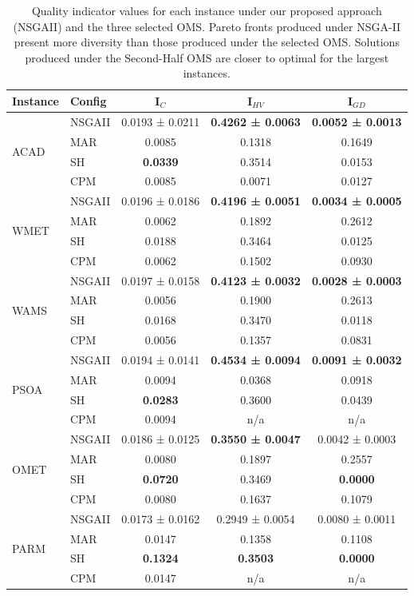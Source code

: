 \documentclass[conference]{IEEEtran}
\begin{document}
\begin{table}[htbp]
  \centering
  \caption{Quality indicator values for each instance under our proposed approach (NSGAII) and the three selected OMS. Pareto fronts produced under NSGA-II present more diversity than those produced under the selected OMS. Solutions produced under the Second-Half OMS are closer to optimal for the largest instances.}
    \begin{tabular}{p{0.7cm} p{0.7cm} ccc}
    \toprule
    \textbf{Instance} & \textbf{Config} & \textbf{I$_{C}$} & \textbf{I$_{HV}$} & \textbf{I$_{GD}$} \\
    \midrule
    \multirow{4}[2]{*}{ACAD} & NSGAII & 0.0193 ± 0.0211 & \textbf{0.4262 ± 0.0063} & \textbf{0.0052 ± 0.0013} \\
          & MAR   & 0.0085 & 0.1318 & 0.1649 \\
          & SH    & \textbf{0.0339} & 0.3514 & 0.0153 \\
          & CPM   & 0.0085 & 0.0071 & 0.0127 \\
    \multirow{4}[2]{*}{WMET} & NSGAII & 0.0196 ± 0.0186 & \textbf{0.4196 ± 0.0051} & \textbf{0.0034 ± 0.0005} \\
          & MAR   & 0.0062 & 0.1892 & 0.2612 \\
          & SH    & 0.0188 & 0.3464 & 0.0125 \\
          & CPM   & 0.0062 & 0.1502 & 0.0930 \\
    \multirow{4}[2]{*}{WAMS} & NSGAII & 0.0197 ± 0.0158 & \textbf{0.4123 ± 0.0032} & \textbf{0.0028 ± 0.0003} \\
          & MAR   & 0.0056 & 0.1900 & 0.2613 \\
          & SH    & 0.0168 & 0.3470 & 0.0118 \\
          & CPM   & 0.0056 & 0.1357 & 0.0831 \\
    \multirow{4}[2]{*}{PSOA} & NSGAII & 0.0194 ± 0.0141 & \textbf{0.4534 ± 0.0094} & \textbf{0.0091 ± 0.0032} \\
          & MAR   & 0.0094 & 0.0368 & 0.0918 \\
          & SH    & \textbf{0.0283} & 0.3600 & 0.0439 \\
          & CPM   & 0.0094 & n/a   & n/a \\
    \multirow{4}[2]{*}{OMET} & NSGAII & 0.0186 ± 0.0125 & \textbf{0.3550 ± 0.0047} & 0.0042 ± 0.0003 \\
          & MAR   & 0.0080 & 0.1897 & 0.2557 \\
          & SH    & \textbf{0.0720} & 0.3469 & \textbf{0.0000} \\
          & CPM   & 0.0080 & 0.1637 & 0.1079 \\
    \multirow{4}[2]{*}{PARM} & NSGAII & 0.0173 ± 0.0162 & 0.2949 ± 0.0054 & 0.0080 ± 0.0011 \\
          & MAR   & 0.0147 & 0.1358 & 0.1108 \\
          & SH    & \textbf{0.1324} & \textbf{0.3503} & \textbf{0.0000} \\
          & CPM   & 0.0147 & n/a   & n/a \\
    \bottomrule
    \end{tabular}%
\end{table}%
\end{document}
